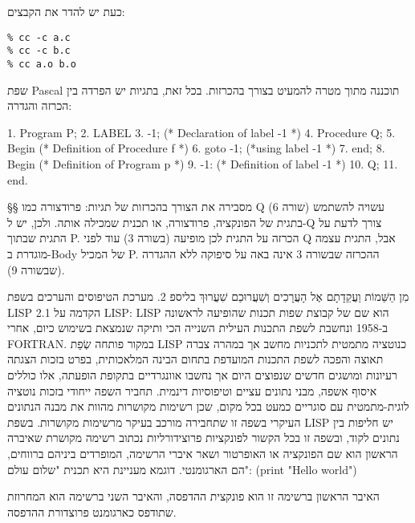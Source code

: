       כעת יש להדר את הקבצים:
\begin{verbatim}
% cc -c a.c
% cc -c b.c
% cc a.o b.o
\end{verbatim}
      שפת Pascal תוכננה מתוך מטרה להמעיט בצורך בהכרזות. בכל זאת, בתגיות יש הפרדה בין הכרזה והגדרה:
\begin{PASCALn}
                                 1. Program P;
                                 2. LABEL
                                 3. -1; (* Declaration of label -1 *)
                                 4. Procedure Q;
                                 5. Begin (* Definition of Procedure f *)
                                 6. goto -1; (*using label -1 *)
                                 7. end;
                                 8. Begin (* Definition of Program p *)
                                 9. -1: (* Definition of label -1 *)
                                 10. Q;
                                 11. end.
\end{PASCALn}
      §§ מסבירה את הצורך בהכרזות של תגיות: פרודצורה כמו Q עשויה להשתמש (שורה 6) בתגית של הפונקציה, פרודצורה, או תכנית שמכילה אותה. ולכן, יש ל-Q צורך לדעת על התגית שבתוך P.
      הכרזה על התגית לכן מופיעה (בשורה 3) עוד לפני Q אבל, התגית עצמה מוגדרת ב-Body של המכיל P. ההכרזה שבשורה 3 אינה באה על סיפוקה ללא ההגדרה (שבשורה 9).

      מִן הַשֵּׁמוֹת וַעֲקֵדָתָם אֶל הָעֲרָכִים וְשִׁעֲרוּכַם
      שִׁעֲרוּךְ בליספ
      2. מערכת הטיפוסים והערכים בשפת LISP
      2.1 הקדמה על LISP:
      LISP הוא שם של קבוצת שפות תכנות שהופיעה לראשונה ב-1958 ונחשבת לשפת התכנות
      העילית השנייה הכי ותיקה שנמצאת בשימוש כיום, אחרי FORTRAN. במקור פותחה שְׂפַת LISP
      כנוטציה מתמטית לתכניות מחשב אך במהרה צברה תאוצה והפכה לשפת התכנות המועדפת בתחום
      הבינה המלאכותית, בפרט בזכות הצגתה רעיונות ומושגים חדשים שנפוצים היום אך נחשבו
      אוונגרדיים בתקופת הופעתה, אלו כוללים איסוף אשפה, מבני נתונים עציים וטיפוסיות
      דינמית. תחביר השפה ייחודי בזכות נוטציה לוגית-מתמטית עם סוגריים כמעט בכל מקום,
      שכן רשימות מקושרות מהוות את מבנה הנתונים העיקרי בשפה זו שתחבירה מורכב בעיקר
      מרשימות מקושרות. בשפת LISP יש חליפות בין נתונים לקוד, ובשפה זו בכל הקשור
      לפונקציות פרוצידורליות נכתוב רשימה מקושרת שאיברה הראשון הוא שם הפונקציה או
      האופרטור ושאר איברי הרשימה, המופרדים ביניהם ברווחים, הם הארגומנטי. דוגמא
      מעניינת היא תכנית "שלום עולם":
      (print "Hello world")

      האיבר הראשון ברשימה זו הוא פונקצית ההדפסה, והאיבר השני ברשימה הוא המחרוזת
      שתודפס כארגומנט פרוצדורת ההדפסה.

